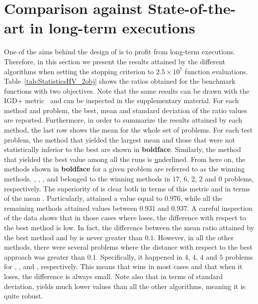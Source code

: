 




\section{Comparison against State-of-the-art \MOEAS{} in long-term executions}
One of the aims behind the design of \AVSDMOEAD{} is to profit from long-term executions.
%
Therefore, in this section we present the results attained by the different algorithms when setting 
the stopping criterion to $2.5 \times 10^7$ function evaluations.
%
Table~\ref{tab:StatisticsHV_2obj} shows the \HV{} ratios obtained for the benchmark functions with two objectives.
%
Note that the same results can be drawn with the IGD+ metric~\cite{ishibuchi2015modified} and can be inspected in the supplementary material.
%
For each method and problem, the best, mean and standard deviation of the \HV{} ratio values are reported.
%
Furthermore, in order to summarize the results attained by each method, the last row shows the mean for the whole set 
of problems.
%
For each test problem, the method that yielded the largest mean and those that were not statistically inferior to the 
best are shown in \textbf{boldface}.
%
Similarly, the method that yielded the best \HV{} value among all the runs is {\ul underlined}.
%
From here on, the methods shown in {\bf boldface} for a given problem are referred to as the winning methods.
%
\AVSDMOEAD{}, \RMOEA{}, \MOEADDE{}, \NSGAIII{} and \NSGAII{} belonged to the winning methods in 
$17$, $6$, $2$, $2$ and $0$ problems, respectively.
%
The superiority of \AVSDMOEAD{} is clear both in terms of this metric and in terms of the mean \HV{}.
%
Particularly, \AVSDMOEAD{} attained a value equal to $0.976$, while all the remaining methods attained values between
$0.931$ and $0.937$.
%
A careful inspection of the data shows that in those cases where \AVSDMOEAD{} loses, the difference with respect to the best 
method is low.
%
In fact, the difference between the mean \HV{} ratio attained by the best method and by \AVSDMOEAD{} is never greater than $0.1$.
%
However, in all the other methods, there were several problems where the distance with respect to the best approach
was greater than $0.1$.
%
Specifically, it happened in $4$, $4$, $4$ and $5$ problems for \RMOEA{}, \MOEADDE{}, \NSGAII{} and \NSGAIII{}, respectively.
%
This means that \AVSDMOEAD{} wins in most cases and that when it loses, the difference is always small.
%
Note also that in terms of standard deviation, \AVSDMOEAD{} yields much lower values than all the other algorithms, meaning
it is quite robust.


